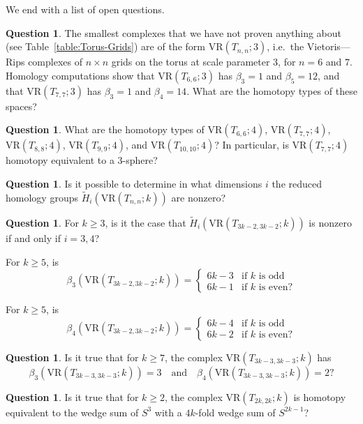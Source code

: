 \documentclass[12pt,a4paper]{amsart}
\theoremstyle{definition}
\newtheorem{question}[theorem]{Question}
\newcommand{\vr}[2]{\mathrm{VR}(#1;#2)}
\numberwithin{equation}{section}
\begin{document}
We end with a list of open questions.

\begin{question}
The smallest complexes that we have not proven anything about (see Table~\ref{table:Torus-Grids}) are of the form $\vr{T_{n,n}}{3}$, i.e.\ the Vietoris---Rips complexes of $n\times n$ grids on the torus at scale parameter $3$, for $n=6$ and $7$.
Homology computations show that $\vr{T_{6,6}}{3}$ has $\beta_3=1$ and $\beta_5=12$, and that $\vr{T_{7,7}}{3}$ has $\beta_3=1$ and $\beta_4=14$.
What are the homotopy types of these spaces?
\end{question}

\begin{question} What are the homotopy types of $\vr{T_{6,6}}{4}$, $\vr{T_{7,7}}{4}$, $\vr{T_{8,8}}{4}$, $\vr{T_{9,9}}{4}$, and $\vr{T_{10,10}}{4}$?
In particular, is $\vr{T_{7,7}}{4}$ homotopy equivalent to a $3$-sphere?
\end{question}

\begin{question}
Is it possible to determine in what dimensions $i$ the reduced homology groups $\tilde{H}_i(\vr{T_{n,n}}{k})$ are nonzero?
\end{question}

\begin{question}
For $k\ge 3$, is it the case that $\tilde{H}_i(\vr{T_{3k-2,3k-2}}{k})$ is nonzero if and only if $i=3,4$?

For $k\ge 5$, is 
\[\beta_3(\vr{T_{3k-2,3k-2}}{k})=
\begin{cases}
6k-3&\text{if }k\text{ is odd} \\
6k-1&\text{if }k\text{ is even?}
\end{cases}\]

For $k\ge 5$, is 
\[\beta_4(\vr{T_{3k-2,3k-2}}{k})=
\begin{cases}
6k-4&\text{if }k\text{ is odd} \\
6k-2&\text{if }k\text{ is even?}
\end{cases}\]
\end{question}

\begin{question}
Is it true that for $k\geq 7$, the complex $\vr{T_{3k-3,3k-3}}{k}$ has
\[
\beta_3(\vr{T_{3k-3,3k-3}}{k})=3
\quad\text{and}\quad
\beta_4(\vr{T_{3k-3,3k-3}}{k})=2?
\]
\end{question}

\begin{question}
Is it true that for $k\geq 2$, the complex $\vr{T_{2k, 2k}}{k}$ is homotopy equivalent to the wedge sum of $S^3$ with a $4k$-fold wedge sum of $S^{2k-1}$?
\end{question}
\end{document}
